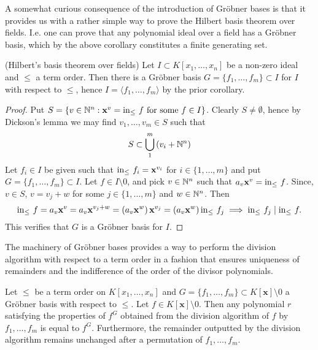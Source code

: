 A somewhat curious consequence of the introduction of Gröbner bases is that it provides us with a rather simple way to prove the Hilbert basis theorem over fields. I.e. one can prove that any polynomial ideal over a field has a Gröbner basis, which by the above corollary constitutes a finite generating set.
\begin{corollary}(Hilbert's basis theorem over fields)
    Let $I\subset K[x_1,\dots,x_n]$ be a non-zero ideal and $\leq$ a term order. Then there is a Gröbner basis $G=\{f_1,\dots,f_m\}\subset I$ for $I$ with respect to $\leq$, hence $I = \langle f_1,\dots,f_m\rangle$ by the prior corollary. 
\end{corollary}
\begin{proof}
    Put $S= \left\{ v\in \mathbb{N}^n : \mathbf{x}^v = \mathrm{in}_\leq\ f \text{ for some } f\in I\right\}$. Clearly $S\neq \emptyset$, hence by Dickson's lemma we may find $v_1,\dots,v_m\in S$ such that 
    $$S\subset \bigcup_1^m \left(v_i+\mathbb{N}^n\right)$$
    Let $f_i\in I$ be given such that $\mathrm{in}_\leq\ f_i = \mathbf{x}^{v_i}$ for $i\in\{1,\dots,m\}$ and put $G=\{f_1,\dots,f_m\}\subset I$. Let $f\in I\setminus 0$, and pick $v\in \mathbb{N}^n$ such that $a_v\mathbf{x}^v= \mathrm{in}_\leq\ f$. Since, $v\in S$, $v = v_j+w$ for some $j\in\{1,\dots,m\}$ and $w\in\mathbb{N}^n$. Then 
    $$\inn\ f = a_v\mathbf{x}^v = a_v\mathbf{x}^{v_j+w} = \left(a_v\mathbf{x}^w\right)\mathbf{x}^{v_j}=\left(a_v\mathbf{x}^w\right)\inn\ f_j \implies \inn\ f_j \mid \inn\ f.$$
    This verifies that $G$ is a Gröbner basis for $I$.
\end{proof}
The machinery of Gröbner bases provides a way to perform the division algorithm with respect to a term order in a fashion that ensures uniqueness of remainders and the indifference of the order of the divisor polynomials.
\begin{theorem}
    Let $\leq$ be a term order on $K[x_1,\dots,x_n]$ and $G = \{f_1,\dots,f_m\}\subset K[\mathbf{x}]\setminus 0$ a Gröbner basis with respect to $\leq$. Let $f\in K[\mathbf{x}]\setminus0$. Then any polynomial $r$ satisfying the properties of $f^G$ obtained from the division algorithm of $f$ by $f_1,\dots,f_m$ is equal to $f^G$. Furthermore, the remainder outputted by the division algorithm remains unchanged after a permutation of $f_1,\dots,f_m$.     
\end{theorem}
